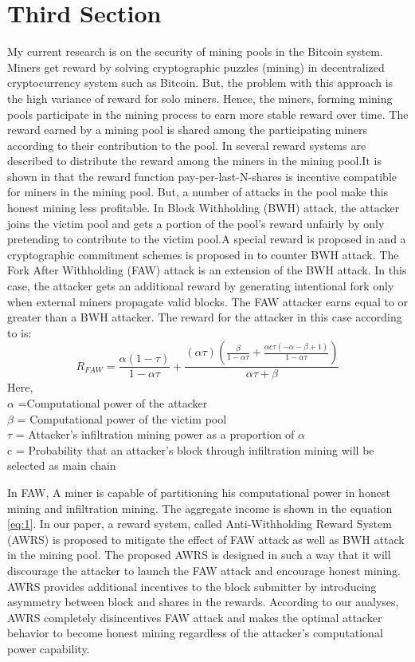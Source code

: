 \documentclass[conference]{IEEEtran}
\begin{document}
\section{Third Section}
My current research is on the security of mining pools in the Bitcoin system. Miners get reward by solving cryptographic puzzles (mining) in decentralized cryptocurrency system such as Bitcoin. But, the problem with this approach is the high variance of reward for solo miners. Hence, the miners, forming mining pools participate in the mining process to earn more stable reward over time. The reward earned by a mining pool is shared among the participating miners according to their contribution to the pool. In \cite{rosenfeld2011analysis} several reward systems are described to distribute the reward among the miners in the mining pool.It is shown in \cite{schrijvers2016incentive} that the reward function pay-per-last-N-shares is incentive compatible for miners in the mining pool. But, a number of attacks in the pool make this honest mining less profitable. In Block Withholding (BWH) attack, the attacker joins the victim pool and gets a portion of the pool’s reward unfairly by only pretending to contribute to the victim pool.A special reward is proposed in \cite{bag2016yet} and a cryptographic commitment schemes is proposed in \cite{bag2017bitcoin} to counter BWH attack. The Fork After Withholding (FAW) attack is an extension of the BWH attack. In this case, the attacker gets an additional reward by generating intentional fork only when external miners propagate valid blocks. The FAW attacker earns equal to or greater than a BWH attacker. The reward for the attacker in this case according to \cite{kwon2017selfish} is:
\begin{equation} \label{eq:1}
R_{FAW}=\frac{\alpha  (1-\tau )}{1-\alpha  \tau }+\frac{(\alpha  \tau ) \left(\frac{\beta }{1-\alpha  \tau }+\frac{\alpha  c \tau  (-\alpha -\beta +1)}{1-\alpha  \tau }\right)}{\alpha  \tau +\beta }
\end{equation}
Here, \\
$\alpha$ =Computational power of the attacker \\
$\beta$ = Computational power of the victim pool \\
$\tau$ = Attacker’s infiltration mining power as a proportion of $\alpha$ \\
c = Probability that an attacker’s block through infiltration mining will be selected as main chain 

In FAW, A miner is capable of partitioning his computational power in honest mining and infiltration mining. The aggregate income is shown in the equation \ref{eq:1}.  
In our paper, a reward system, called Anti-Withholding Reward System (AWRS) is proposed to mitigate the effect of FAW attack as well as BWH attack in the mining pool. The proposed AWRS is designed in such a way that it will discourage the attacker to launch the FAW attack and encourage honest mining. AWRS provides additional incentives to the block submitter by introducing asymmetry between block and shares in the rewards. According to our analyses, AWRS completely disincentives FAW attack and makes the optimal attacker behavior to become honest mining regardless of the attacker's computational power capability.



\end{document}

